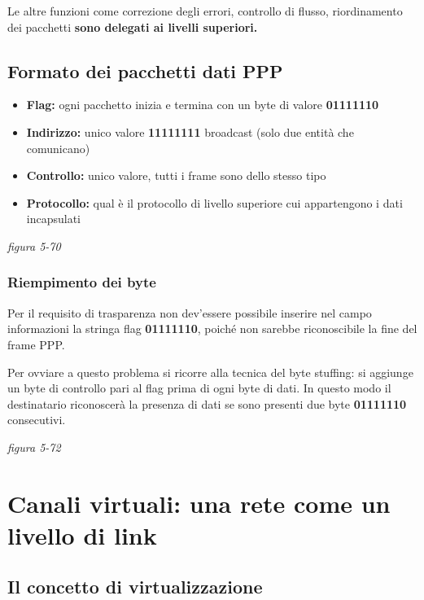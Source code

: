 \documentclass[
]{article}
\begin{document}
Le altre funzioni come correzione degli errori, controllo di flusso,
riordinamento dei pacchetti \textbf{sono delegati ai livelli superiori.}

\hypertarget{header-n257}{%
\subsection{Formato dei pacchetti dati PPP}\label{header-n257}}

\begin{itemize}
\item
  \textbf{Flag: }ogni pacchetto inizia e termina con un byte di valore
  \textbf{01111110}
\item
  \textbf{Indirizzo: }unico valore \textbf{11111111} broadcast (solo due
  entità che comunicano)
\item
  \textbf{Controllo: }unico valore, tutti i frame sono dello stesso tipo
\item
  \textbf{Protocollo: }qual è il protocollo di livello superiore cui
  appartengono i dati incapsulati
\end{itemize}

\emph{figura 5-70}

\hypertarget{header-n268}{%
\subsubsection{Riempimento dei byte}\label{header-n268}}

Per il requisito di trasparenza non dev'essere possibile inserire nel
campo informazioni la stringa flag \textbf{01111110}, poiché non sarebbe
riconoscibile la fine del frame PPP.

Per ovviare a questo problema si ricorre alla tecnica del byte stuffing:
si aggiunge un byte di controllo pari al flag prima di ogni byte di
dati. In questo modo il destinatario riconoscerà la presenza di dati se
sono presenti due byte \textbf{01111110} consecutivi.

\emph{figura 5-72}

\hypertarget{header-n272}{%
\section{Canali virtuali: una rete come un livello di
link}\label{header-n272}}

\hypertarget{header-n273}{%
\subsection{Il concetto di virtualizzazione}\label{header-n273}}
\end{document}
